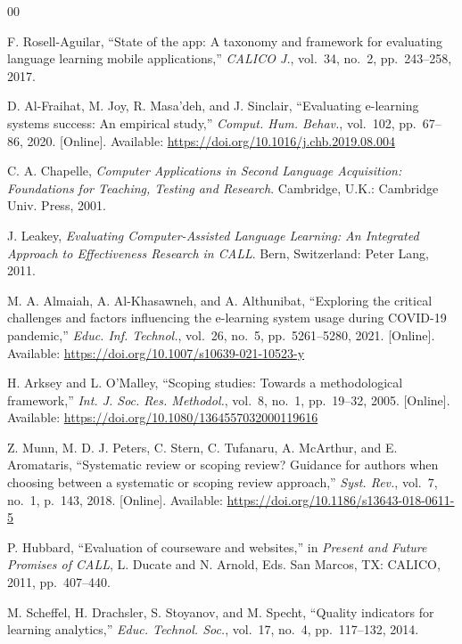 \documentclass[conference]{IEEEtran}
\begin{document}
\begin{thebibliography}{00}

F. Rosell-Aguilar, ``State of the app: A taxonomy and framework for
evaluating language learning mobile applications,'' \textit{CALICO J.},
vol.~34, no.~2, pp.~243--258, 2017.

D. Al-Fraihat, M. Joy, R. Masa'deh, and J. Sinclair, ``Evaluating
e-learning systems success: An empirical study,'' \textit{Comput.
Hum. Behav.}, vol.~102, pp.~67--86, 2020. [Online]. Available:
\url{https://doi.org/10.1016/j.chb.2019.08.004}

C. A. Chapelle, \textit{Computer Applications in Second Language
Acquisition: Foundations for Teaching, Testing and Research}.
Cambridge, U.K.: Cambridge Univ. Press, 2001.

J. Leakey, \textit{Evaluating Computer-Assisted Language Learning:
An Integrated Approach to Effectiveness Research in CALL}. Bern,
Switzerland: Peter Lang, 2011.

M. A. Almaiah, A. Al-Khasawneh, and A. Althunibat, ``Exploring the
critical challenges and factors influencing the e-learning system usage
during COVID-19 pandemic,'' \textit{Educ. Inf. Technol.}, vol.~26,
no.~5, pp.~5261--5280, 2021. [Online]. Available:
\url{https://doi.org/10.1007/s10639-021-10523-y}

H. Arksey and L. O'Malley, ``Scoping studies: Towards a methodological
framework,'' \textit{Int. J. Soc. Res. Methodol.}, vol.~8, no.~1,
pp.~19--32, 2005. [Online]. Available:
\url{https://doi.org/10.1080/1364557032000119616}

Z. Munn, M. D. J. Peters, C. Stern, C. Tufanaru, A. McArthur, and
E. Aromataris, ``Systematic review or scoping review? Guidance for
authors when choosing between a systematic or scoping review
approach,'' \textit{Syst. Rev.}, vol.~7, no.~1, p.~143, 2018.
[Online]. Available: \url{https://doi.org/10.1186/s13643-018-0611-5}

P. Hubbard, ``Evaluation of courseware and websites,'' in \textit{Present
and Future Promises of CALL}, L. Ducate and N. Arnold, Eds. San Marcos,
TX: CALICO, 2011, pp.~407--440.

M. Scheffel, H. Drachsler, S. Stoyanov, and M. Specht, ``Quality
indicators for learning analytics,'' \textit{Educ. Technol. Soc.},
vol.~17, no.~4, pp.~117--132, 2014.


\end{thebibliography}
\end{document}
